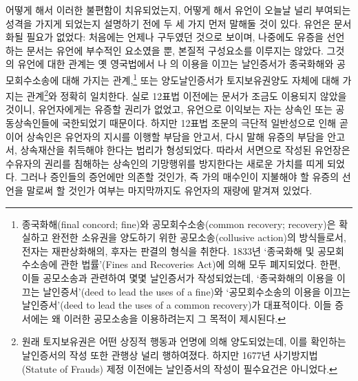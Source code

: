 어떻게 해서 이러한 불편함이 치유되었는지,
어떻게 해서 유언이 오늘날 널리 부여되는 성격을 가지게 되었는지
설명하기 전에
두 세 가지 먼저 말해둘 것이 있다.
유언은 문서화될 필요가 없었다:
처음에는 언제나 구두였던 것으로 보이며,
나중에도 유증을 선언하는 문서는 유언에 부수적인 요소였을 뿐,
본질적 구성요소를 이루지는 않았다.
그것의 유언에 대한 관계는
\hypertarget{finerecovery}{옛} 영국법에서
나
의
이용을 이끄는 날인증서가
종국화해와
공모회수소송에
대해 가지는 관계,\footnote{%
  종국화해(final concord; fine)와 공모회수소송(common recovery; recovery)은
  확실하고 완전한 소유권을 양도하기 위한
  공모소송(collusive action)의 방식들로서,
  전자는 재판상화해의, 후자는 판결의 형식을 취한다.
  1833년 `종국화해 및 공모회수소송에 관한 법률'(Fines and Recoveries Act)에
  의해 모두 폐지되었다.
  한편, 이들 공모소송과 관련하여 몇몇 날인증서가 작성되었는데,
  `종국화해의 이용을 이끄는 날인증서'(deed to lead the uses of a fine)와
  `공모회수소송의 이용을 이끄는
  날인증서'(deed to lead the uses of a common recovery)가 대표적이다.
  이들 증서에는 왜 이러한 공모소송을 이용하려는지 그 목적이 제시된다.
}
또는
양도날인증서가
토지보유권양도 자체에 대해 가지는 관계\footnote{%
  원래 토지보유권은 어떤 상징적 행동과 언명에 의해 양도되었는데,
  이를 확인하는 날인증서의 작성 또한 관행상 널리 행하여졌다.
  하지만 1677년 사기방지법(Statute of Frauds) 제정 이전에는
  날인증서의 작성이 필수요건은 아니었다.
}와
정확히 일치한다.
실로 12표법 이전에는 문서가 조금도 이용되지 않았을 것이니,
유언자에게는 유증할 권리가 없었고,
유언으로 이익보는 자는 상속인 또는 공동상속인들에 국한되었기 때문이다.
하지만 12표법 조문의 극단적 일반성으로 인해
곧이어
상속인은 유언자의 지시를 이행할 부담을 안고서,
다시 말해 유증의 부담을 안고서,
상속재산을 취득해야 한다는 법리가
형성되었다.
따라서 서면으로 작성된 유언장은
수유자의 권리를 침해하는 상속인의 기망행위를
방지한다는 새로운 가치를 띠게 되었다.
그러나
증인들의 증언에만 의존할 것인가, 즉
가의 매수인이 지불해야 할 유증의 선언을 말로써 할 것인가 여부는
마지막까지도 유언자의 재량에 맡겨져 있었다.

